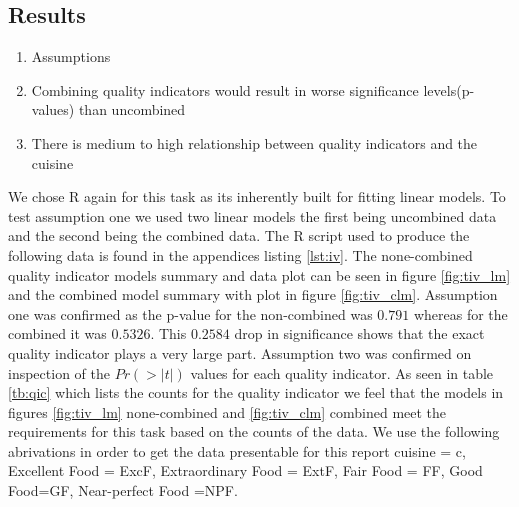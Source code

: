 \documentclass[letterpaper,10pt]{article}
\begin{document}
\subsection*{Results}
\begin{enumerate}
\item[] Assumptions 
\item Combining quality indicators would result in worse significance levels(p-values) than uncombined
\item There is medium to high relationship between quality indicators and the cuisine 
\end{enumerate}
We chose R again for this task as its inherently built for fitting linear models. To test assumption one we used two linear models the first being uncombined data and the second being the combined data. The R script used to produce the following data is found in the appendices listing \hyperref[lst:iv]{\ref{lst:iv}}. \newline \newline
The none-combined quality indicator models summary and data plot can be seen in figure \hyperref[fig:tiv_lm]{\ref{fig:tiv_lm}} and the combined model summary with plot in figure \hyperref[fig:tiv_clm]{\ref{fig:tiv_clm}}. Assumption one was confirmed as the p-value for the non-combined was $0.791$ whereas for the combined it was $0.5326$. This $0.2584$ drop in significance shows that the exact quality indicator plays a very large part.
Assumption two was confirmed on inspection of the $Pr(>|t|)$ values for each quality indicator. 
As seen in table \hyperref[tb:qic]{\ref{tb:qic}} which lists the counts for the quality indicator we feel that the models in figures \hyperref[fig:tiv_lm]{\ref{fig:tiv_lm}}  none-combined and \hyperref[fig:tiv_clm]{\ref{fig:tiv_clm}} combined meet the requirements for this task based on the counts of the data. We use the following abrivations in order to get the data presentable for this report cuisine = c,  Excellent Food = ExcF, Extraordinary Food = ExtF, Fair Food = FF, Good Food=GF, Near-perfect Food =NPF.
\end{document}
